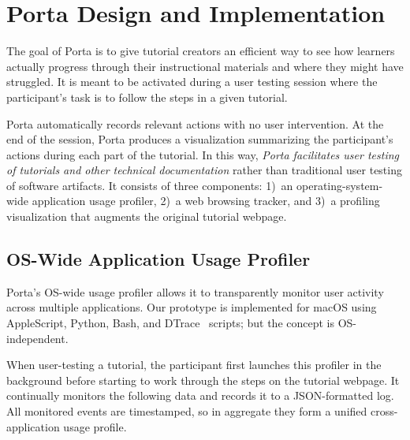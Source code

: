 \section{Porta Design and Implementation}

The goal of Porta is to give tutorial creators an efficient way to see
how learners actually progress through their instructional materials and
where they might have struggled. It is meant to be activated during a
user testing session where the participant's task is to follow the steps
in a given tutorial.

Porta automatically records relevant actions with no user intervention.
At the end of the session, Porta produces a visualization summarizing
the participant's actions during each part of the tutorial.
%
In this way, \emph{Porta facilitates user testing of tutorials and other
technical documentation} rather than traditional user testing of
software artifacts.
%
It consists of three components: 1)~an operating-system-wide application
usage profiler, 2)~a web browsing tracker, and 3)~a profiling
visualization that augments the original tutorial webpage.


\subsection{OS-Wide Application Usage Profiler}

Porta's OS-wide usage profiler allows it to transparently monitor user
activity across multiple applications. Our prototype is implemented for
macOS using AppleScript, Python, Bash, and DTrace~\cite{Cantrill2004} scripts; but
the concept is OS-independent.


When user-testing a tutorial, the participant first launches this
profiler in the background before starting to work through the steps on
the tutorial webpage. It continually monitors the following data and
records it to a JSON-formatted log. All monitored events are
timestamped, so in aggregate they form a unified cross-application usage
profile.


